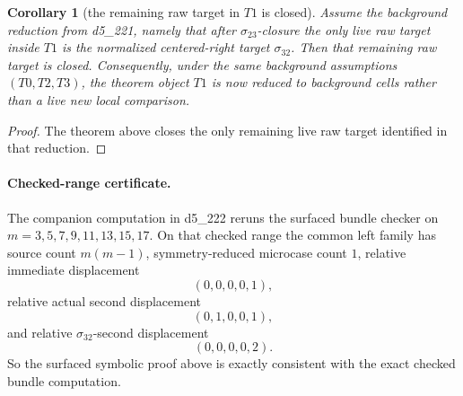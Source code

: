 \documentclass[11pt]{article}
\newtheorem{corollary}{Corollary}
\theoremstyle{remark}
\newcommand{\sig}[2]{\sigma_{#1#2}}
\newcommand{\sigC}{\sig{2}{3}}
\newcommand{\sigR}{\sig{3}{2}}
\begin{document}
\begin{corollary}[the remaining raw target in \(T1\) is closed]
Assume the background reduction from d5\_221, namely that after
\(\sigC\)-closure the only live raw target inside \(T1\) is the normalized
centered-right target \(\sigR\).  Then that remaining raw target is closed.
Consequently, under the same background assumptions \((T0,T2,T3)\), the theorem
object \(T1\) is now reduced to background cells rather than a live new local
comparison.
\end{corollary}

\begin{proof}
The theorem above closes the only remaining live raw target identified in
that reduction.
\end{proof}

\paragraph{Checked-range certificate.}
The companion computation in d5\_222 reruns the surfaced bundle checker on
\(m=3,5,7,9,11,13,15,17\).  On that checked range the common left family has
source count \(m(m-1)\), symmetry-reduced microcase count \(1\),
relative immediate displacement
\[
(0,0,0,0,1),
\]
relative actual second displacement
\[
(0,1,0,0,1),
\]
and relative \(\sigR\)-second displacement
\[
(0,0,0,0,2).
\]
So the surfaced symbolic proof above is exactly consistent with the exact
checked bundle computation.
\end{document}

